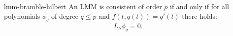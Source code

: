\begin{Lemma}{lmm-bramble-hilbert}
  An LMM is consistent of order $p$ if and only if for all polynomials
  $\phi_q$ of degree $q \le p$ and $f(t,q(t)) = q'(t)$ there holds:
  \begin{gather}
    \label{eq:lmm:14}
    L_h \phi_q = 0.
  \end{gather}
\end{Lemma}

